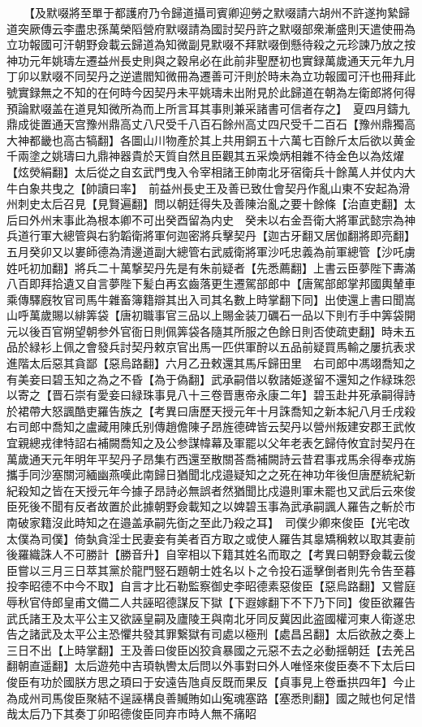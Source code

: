 　　【及默啜將至單于都護府乃令歸道攝司賓卿迎勞之默啜請六胡州不許遂拘縶歸道突厥傳云李盡忠孫萬榮䧟營府默啜請為國討契丹許之默啜部衆漸盛則天遣使冊為立功報國可汗朝野僉載云歸道為知微副見默啜不拜默啜倒懸待殺之元珍諫乃放之按神功元年姚璹左遷益州長史則與之穀帛必在此前非聖歷初也實録萬歲通天元年九月丁卯以默啜不同契丹之逆遣閻知微冊為遷善可汗則於時未為立功報國可汗也冊拜此號實録無之不知的在何時今因契丹未平姚璹未出附見於此歸道在朝為左衛郎將何得預論默啜盖在道見知微所為而上所言耳其事則兼采諸書可信者存之】　夏四月鑄九鼎成徙置通天宫豫州鼎高丈八尺受千八百石餘州高丈四尺受千二百石【豫州鼎獨高大神都畿也高古犒翻】各圖山川物產於其上共用銅五十六萬七百餘斤太后欲以黄金千兩塗之姚璹曰九鼎神器貴於天質自然且臣觀其五采煥炳相雜不待金色以為炫燿【炫熒絹翻】太后從之自玄武門曳入令宰相諸王帥南北牙宿衛兵十餘萬人并仗内大牛白象共曳之【帥讀曰率】　前益州長史王及善已致仕會契丹作亂山東不安起為滑州刺史太后召見【見賢遍翻】問以朝廷得失及善陳治亂之要十餘條【治直吏翻】太后曰外州末事此為根本卿不可出癸酉留為内史　癸未以右金吾衛大將軍武懿宗為神兵道行軍大總管與右豹韜衛將軍何迦密將兵擊契丹【迦古牙翻又居伽翻將即亮翻】五月癸卯又以婁師德為清邊道副大總管右武威衛將軍沙吒忠義為前軍總管【沙吒虜姓吒初加翻】將兵二十萬撃契丹先是有朱前疑者【先悉薦翻】上書云臣夢陛下夀滿八百即拜拾遺又自言夢陛下髪白再玄齒落更生遷駕部郎中【唐駕部郎掌邦國輿輦車乘傳驛廐牧官司馬牛雜畜簿籍辯其出入司其名數上時掌翻下同】出使還上書曰聞嵩山呼萬歲賜以緋筭袋【唐初職事官三品以上賜金装刀礪石一品以下則冇手中筭袋開元以後百官朔望朝参外官衙日則佩筭袋各隨其所服之色餘日則否使疏吏翻】時未五品於緑衫上佩之會發兵討契丹敕京官出馬一匹供軍酧以五品前疑買馬輸之屢抗表求進階太后惡其貪鄙【惡烏路翻】六月乙丑敕還其馬斥歸田里　右司郎中馮翊喬知之有美妾曰碧玉知之為之不昏【為于偽翻】武承嗣借以敎諸姫遂留不還知之作緑珠怨以寄之【晋石崇有愛妾曰緑珠事見八十三卷晋惠帝永康二年】碧玉赴井死承嗣得詩於裙帶大怒諷酷吏羅告族之【考異曰唐歷天授元年十月誅喬知之新本紀八月壬戌殺右司郎中喬知之盧藏用陳氏别傳趙儋陳子昂旌德碑皆云契丹以營州叛建安郡王武攸宜親總戎律特詔右補闕喬知之及公参謀幃幕及軍罷以父年老表乞歸侍攸宜討契丹在萬歲通天元年明年平契丹子昂集冇西還至散關荅喬補闕詩云昔君事戎馬余得奉戎旃攜手同沙塞關河緬幽燕嘆此南歸日猶聞北戍邉疑知之之死在神功年後但唐歷統紀新紀殺知之皆在天授元年今據子昂詩必無誤者然猶聞比戍邉則軍未罷也又武后云來俊臣死後不聞有反者故置於此據朝野僉載知之以婢碧玉事為武承嗣諷人羅告之斬於市南破家籍沒此時知之在邉盖承嗣先衘之至此乃殺之耳】　司僕少卿來俊臣【光宅改太僕為司僕】倚埶貪淫士民妻妾有美者百方取之或使人羅告其辠矯稱敕以取其妻前後羅織誅人不可勝計【勝音升】自宰相以下籍其姓名而取之【考異曰朝野僉載云俊臣嘗以三月三日萃其黨於龍門竪石題朝士姓名以卜之令投石遥擊倒者則先令告至暮投李昭德不中今不取】自言才比石勒監察御史李昭德素惡俊臣【惡烏路翻】又嘗庭辱秋官侍郎皇甫文備二人共誣昭德謀反下獄【下遐嫁翻下不下乃下同】俊臣欲羅告武氏諸王及太平公主又欲誣皇嗣及廬陵王與南北牙同反冀因此盗國權河東人衛遂忠告之諸武及太平公主恐懼共發其罪繋獄有司處以極刑【處昌呂翻】太后欲赦之奏上三日不出【上時掌翻】王及善曰俊臣凶狡貪暴國之元惡不去之必動揺朝廷【去羌呂翻朝直遥翻】太后遊苑中吉頊執轡太后問以外事對曰外人唯怪來俊臣奏不下太后曰俊臣有功於國朕方思之頊曰于安遠告虺貞反既而果反【貞事見上卷垂拱四年】今止為成州司馬俊臣聚結不逞誣構良善贓賄如山寃魂塞路【塞悉則翻】國之賊也何足惜哉太后乃下其奏丁卯昭德俊臣同弃市時人無不痛眧